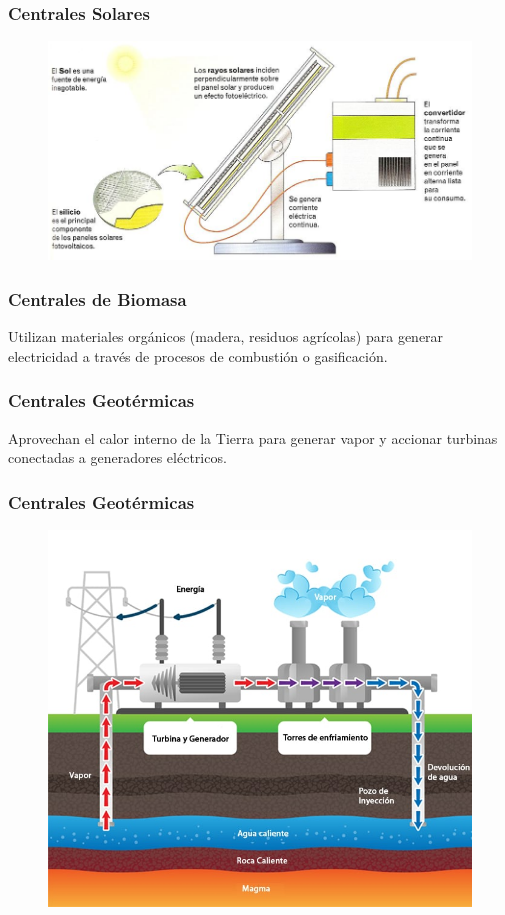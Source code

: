 \documentclass[14pt]{beamer}
\begin{document}
\begin{frame}
\frametitle{Centrales Solares}
\vspace*{-1cm}
\begin{figure}
    \centering
    \includegraphics[scale=0.5]{Imagenes/Planta_Solar_02.jpeg}
\end{figure}
\end{frame}
\begin{frame}
\frametitle{Centrales de Biomasa}
Utilizan materiales orgánicos (madera, residuos agrícolas) para generar electricidad a través de procesos de combustión o gasificación.
\end{frame}
\begin{frame}
\frametitle{Centrales Geotérmicas}
Aprovechan el calor interno de la Tierra para generar vapor y accionar turbinas conectadas a generadores eléctricos.
\end{frame}
\begin{frame}
\frametitle{Centrales Geotérmicas}
\vspace*{-1cm}
\begin{figure}
\centering
\includegraphics[scale=0.3]{Imagenes/Planta_Geotermica_01.jpg}
\end{figure}
\end{frame}
\end{document}
